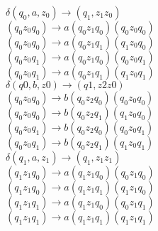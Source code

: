\documentclass[9pt]{beamer}
\begin{document}
\begin{frame}

\begin{center}
$\delta(q_0, a, z_0) \rightarrow (q_1, z_1z_0)$ \\
 \hspace*{1cm} $(q_0 z_0 q_0) \rightarrow a(q_0 z_1 q_0) (q_0 z_0 q_0)$ \\
 \hspace*{1cm} $(q_0 z_0 q_0) \rightarrow a(q_0 z_1 q_1) (q_1 z_0 q_0)$ \\
 \hspace*{1cm} $(q_0 z_0 q_1) \rightarrow a(q_0 z_1 q_0) (q_0 z_0 q_1)$ \\
 \hspace*{1cm} $(q_0 z_0 q_1) \rightarrow a(q_0 z_1 q_1) (q_1 z_0 q_1)$ \\
$\delta(q0, b, z0) \rightarrow (q1, z2z0)$ \\
 \hspace*{1cm} $(q_0 z_0 q_0) \rightarrow b(q_0 z_2 q_0) (q_0 z_0 q_0)$ \\
 \hspace*{1cm} $(q_0 z_0 q_0) \rightarrow b(q_0 z_2 q_1) (q_1 z_0 q_0)$ \\
 \hspace*{1cm} $(q_0 z_0 q_1) \rightarrow b(q_0 z_2 q_0) (q_0 z_0 q_1)$ \\
 \hspace*{1cm} $(q_0 z_0 q_1) \rightarrow b(q_0 z_2 q_1) (q_1 z_0 q_1)$ \\
$\delta(q_1, a, z_1) \rightarrow (q_1, z_1z_1)$ \\
 \hspace*{1cm} $(q_1 z_1 q_0) \rightarrow a(q_1 z_1 q_0) (q_0 z_1 q_0)$ \\
 \hspace*{1cm} $(q_1 z_1 q_0) \rightarrow a(q_1 z_1 q_1) (q_1 z_1 q_0)$ \\
 \hspace*{1cm} $(q_1 z_1 q_1) \rightarrow a(q_1 z_1 q_0) (q_0 z_1 q_1)$ \\
 \hspace*{1cm} $(q_1 z_1 q_1) \rightarrow a(q_1 z_1 q_1) (q_1 z_1 q_1)$ \\
\end{center}
\end{frame}
\end{document}
